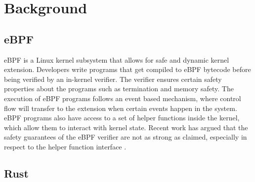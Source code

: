 \section{Background}
\label{sec:background}

\subsection{eBPF}
eBPF is a Linux kernel subsystem that allows for safe and dynamic kernel extension.
Developers write programs that get compiled to eBPF bytecode before being verified by an in-kernel verifier.
The verifier ensures certain safety properties about the programs such as termination and memory safety.
The execution of eBPF programs follows an event based mechanism, where control flow will transfer to the extension when certain events happen in the system.
eBPF programs also have access to a set of helper functions inside the kernel, which allow them to interact with kernel state.
Recent work has argued that the safety guarantees of the eBPF verifier are not as strong as claimed, especially in respect to the helper function interface \cite{untenableVerification}.


\subsection{Rust}

